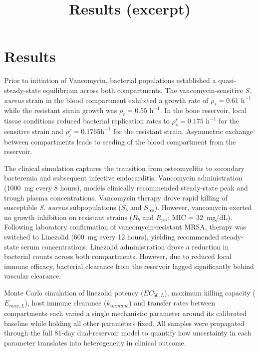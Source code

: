 \documentclass[11pt]{article}
\title{Results (excerpt)}
\author{}
\date{}
\begin{document}
\maketitle

\section{Results}

Prior to initiation of Vancomycin, bacterial populations established a
quasi-steady-state equilibrium across both compartments. The
vancomycin-sensitive \textit{S. aureus} strain in the blood compartment
exhibited a growth rate of $\rho_s = 0.61\text{ h}^{-1}$ while the resistant
strain growth was $\rho_r = 0.55\text{ h}^{-1}$. In the bone reservoir, local
tissue conditions reduced bacterial replication rates to $\rho_s^r =
0.175\text{ h}^{-1}$ for the sensitive strain and $\rho_r^r = 0.1765\text{
h}^{-1}$ for the resistant strain. Asymmetric exchange between compartments
leads to seeding of the blood compartment from the reservoir.

The clinical simulation captures the transition from osteomyelitis to
secondary bacteremia and subsequent infective endocarditis. Vancomycin
administration (1000~mg every 8 hours), models clinically recommended
steady-state peak and trough plasma concentrations. Vancomycin therapy drove
rapid killing of susceptible \textit{S. aureus} subpopulations ($S_b$ and
$S_{\text{res}}$). However, vancomycin exerted no growth inhibition on
resistant strains ($R_b$ and $R_{\text{res}}$; MIC = 32~mg/dL). Following
laboratory confirmation of vancomycin-resistant MRSA, therapy was switched to
Linezolid (600~mg every 12 hours), yielding recommended steady-state serum
concentrations. Linezolid administration drove a reduction in bacterial
counts across both compartments. However, due to reduced local immune
efficacy, bacterial clearance from the reservoir lagged significantly behind
vascular clearance.

Monte Carlo simulation of linezolid potency ($EC_{50,L}$), maximum killing
capacity ($E_{max,L}$), host immune clearance ($k_{immune}$) and transfer
rates between compartments each varied a single mechanistic parameter around
its calibrated baseline while holding all other parameters fixed. All
samples were propagated through the full 81-day dual-reservoir model to
quantify how uncertainty in each parameter translates into heterogeneity in
clinical outcome.
\end{document}

